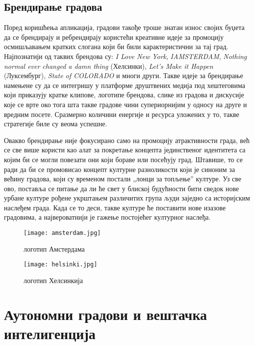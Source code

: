 \documentclass{article}
\begin{document}
\subsection{Брендирање градова}
Поред коришћења апликација, градови такође троше знатан износ својих буџета да се брендирају и ребрендирају користећи креативне идеје за промоцију осмишљавањем кратких слогана који би били карактеристични за тај град. Најпознатији од таквих брендова су: \textit{I Love New York}, \textit{IAMSTERDAM}, \textit{Nothing normal ever changed a damn thing} (Хелсинки), \textit{Let’s Make it Happen}  (Луксембург), \textit{State of COLORADO} и многи други. Такве идеје за брендирање намењене су да се интегришу у платформе друштвених медија под хештеговима који приказују кратке клипове, логотипе брендова, слике из градова и дискусије које се врте око тога шта такве градове чини супериорнијим у односу на друге и вредним посете. Сразмерно количини енергије и ресурса уложених у то, такве стратегије биле су веома успешне.

Овакво брендирање није фокусирано само на промоцију атрактивности града, већ се све више користи као алат за покретање концепта јединственог идентитета са којим би се могли повезати они који бораве или посећују град. Штавише, то се ради да би се промовисао концепт културне разноликости који је синоним за већину градова, који су временом постали „лонци за топљење” културе. Уз све ово, поставља се питање да ли ће свет у блиској будућности бити сведок нове урбане културе рођене укрштањем различитих група људи заједно са историјским наслеђем града. Када се то деси, такве културе ће поставити нове изазове градовима, а највероватнији је гажење постојећег културног наслеђа.

\begin{figure}[H]
\centering
\texttt{[image: amsterdam.jpg]}
\caption{логотип Амстердама}
\end{figure}

\begin{figure}[H]
\centering
\texttt{[image: helsinki.jpg]}
\caption{логотип Хелсинкија}
\end{figure}

\section{Аутономни градови и вештачка интелигенција}
\end{document}
